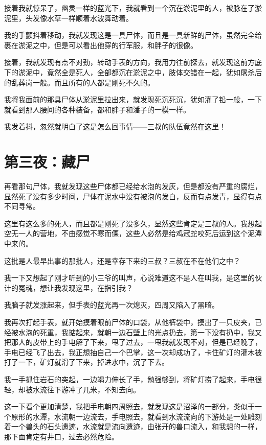 接着我就惊呆了，幽灵一样的蓝光下，我就看到一个沉在淤泥里的人，被脉在了淤泥里，头发像水草一样顺着水波舞动着。

我的手颤抖着移动，我就发现这是一具尸体，而且是一具新鲜的尸体，虽然完全给裹在淤泥之中，但是可以看出他穿的行军服，和胖子的很像。

接着，我就发现有点不对劲，转动手表的方向，我用力往前探去，就发现这前方底下的淤泥中，竟然全是死人，全部都沉在淤泥之中，肢体交错在一起，犹如屠杀后的乱葬岗一般。而且所有的人都是刚死不久的。

我将我面前的那具尸体从淤泥里拉出来，就发现死沉死沉，犹如灌了铅一般，一下就看到那人腰间的各种装备，都和胖子和潘子的一模一样。

我发着抖，忽然就明白了这是怎么回事情——三叔的队伍竟然在这里！

\chapter{第三夜：藏尸}

再看那句尸体，我就发现这些尸体都已经给水泡的发灰，但是都没有严重的腐烂，显然死了没有多少时间，尸体在泥水中没有被泡的发白，反而有点发青，显得有点不同寻常。

这里有这么多的死人，而且都是刚死了没多久，显然这些肯定是三叔的人。我想起空无一人的营地，不由感觉不寒而傈，这些人必然是给鸡冠蛇咬死后运到这个泥潭中来的。

这批是人最早出事的那批人，还是幸存下来的三叔？三叔在不在他们之中？

我一下又想起了刚才听到的小三爷的叫声，心说难道这不是人在叫我，是这里的伙计的冤魂，想让我发现这里，在指引我？

我脑子就发涨起来，但手表的蓝光再一次熄灭，四周又陷入了黑暗。

我再次打起手表，就开始摸着眼前尸体的口袋，从他裤袋中，摸出了一只皮夹，已经被水泡的死重，我掂起来，就朝一边石壁上的光点扔去，第一下没有扔中，我又把那人的皮带上的手电解了下来，甩了过去，一甩我就发现不对，但是已经晚了，手电已经飞了出去，我正想抽自己一个巴掌，这一次却成功了，卡住矿灯的灌木被打了一下，矿灯就滑了下来，掉进水中，沉了下去。

我一手抓住岩石的突起，一边竭力伸长了手，勉强够到，将矿灯捞了起来，手电很轻，却被水流往下游冲了几米，不知去向。

这一下看个更加清楚，我把手电朝四周照去，就发现这是沼泽的一部分，类似于一个原形的水潭，水流朝一边流去，手电照去，就看到水流流向的下游处是一处雕刻着一个兽头的石头遗迹，水流就是流向遗迹，由张开的兽口流入，和我想的一样，那下面肯定有井口，过去必然危险。

